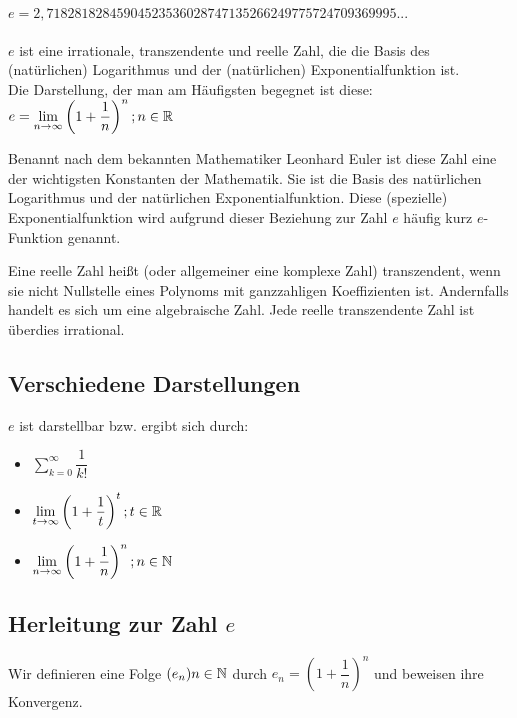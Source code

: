 \begin{Definition}
$e = 2,71828182845904523536028747135266249775724709369995...$\\
\\
$e$ ist eine irrationale, transzendente und reelle Zahl, die die Basis des (natürlichen) Logarithmus und der (natürlichen) Exponentialfunktion ist.\\
Die Darstellung, der man am Häufigsten begegnet ist diese:
$e=\lim\limits_{n\to \infty}\left(1+\dfrac{1}{n}\right)^n;n\in\mathbb{R}$
\end{Definition}
Benannt nach dem bekannten Mathematiker Leonhard Euler ist diese Zahl eine der wichtigsten Konstanten der Mathematik.
Sie ist die Basis des natürlichen Logarithmus und der natürlichen Exponentialfunktion. Diese (spezielle) Exponentialfunktion wird aufgrund dieser Beziehung zur Zahl $e$ häufig kurz $e$-Funktion genannt.
\begin{Definition}
  Eine reelle Zahl heißt (oder allgemeiner eine komplexe Zahl) transzendent,
  wenn sie nicht Nullstelle eines Polynoms mit ganzzahligen Koeffizienten ist.
  Andernfalls handelt es sich um eine algebraische Zahl. Jede reelle transzendente Zahl ist überdies irrational.
\end{Definition}

	\subsection{Verschiedene Darstellungen}

$e$ ist darstellbar bzw. ergibt sich durch:
\begin{itemize}
\item $\sum\limits_{k=0}^{\infty}\dfrac{1}{k!}$
\item $\lim\limits_{t\to \infty}\left(1+\dfrac{1}{t}\right)^t;t\in\mathbb{R}$
\item $\lim\limits_{n\to \infty}\left(1+\dfrac{1}{n}\right)^n;n\in\mathbb{N}$
\end{itemize}

	\subsection{Herleitung zur Zahl $e$}

Wir definieren eine Folge $(e_{n})n\in\mathbb{N}$ durch $e_{n}=\left(1+\dfrac{1}{n}\right)^n$ und beweisen ihre Konvergenz.

